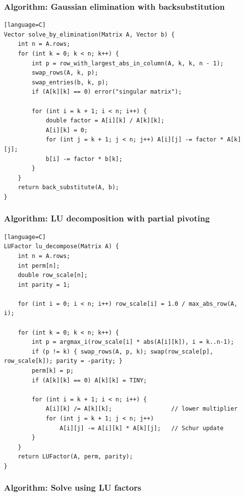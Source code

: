 \documentclass[11pt]{article}
\begin{document}
\subsubsection{Algorithm: Gaussian elimination with backsubstitution}\label{algorithm-gaussian-elimination-with-backsubstitution}

\begin{verbatim}[language=C]
Vector solve_by_elimination(Matrix A, Vector b) {
    int n = A.rows;
    for (int k = 0; k < n; k++) {
        int p = row_with_largest_abs_in_column(A, k, k, n - 1);
        swap_rows(A, k, p);
        swap_entries(b, k, p);
        if (A[k][k] == 0) error("singular matrix");

        for (int i = k + 1; i < n; i++) {
            double factor = A[i][k] / A[k][k];
            A[i][k] = 0;
            for (int j = k + 1; j < n; j++) A[i][j] -= factor * A[k][j];
            b[i] -= factor * b[k];
        }
    }
    return back_substitute(A, b);
}
\end{verbatim}

\subsubsection{Algorithm: LU decomposition with partial pivoting}\label{algorithm-lu-decomposition-with-partial-pivoting}

\begin{verbatim}[language=C]
LUFactor lu_decompose(Matrix A) {
    int n = A.rows;
    int perm[n];
    double row_scale[n];
    int parity = 1;

    for (int i = 0; i < n; i++) row_scale[i] = 1.0 / max_abs_row(A, i);

    for (int k = 0; k < n; k++) {
        int p = argmax_i(row_scale[i] * abs(A[i][k]), i = k..n-1);
        if (p != k) { swap_rows(A, p, k); swap(row_scale[p], row_scale[k]); parity = -parity; }
        perm[k] = p;
        if (A[k][k] == 0) A[k][k] = TINY;

        for (int i = k + 1; i < n; i++) {
            A[i][k] /= A[k][k];                 // lower multiplier
            for (int j = k + 1; j < n; j++)
                A[i][j] -= A[i][k] * A[k][j];   // Schur update
        }
    }
    return LUFactor(A, perm, parity);
}
\end{verbatim}

\subsubsection{Algorithm: Solve using LU factors}\label{algorithm-solve-using-lu-factors}
\end{document}
